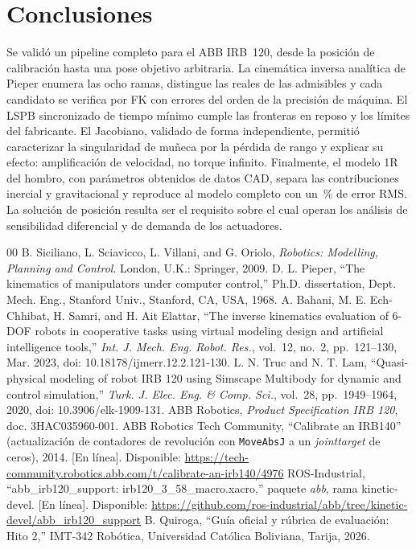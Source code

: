 \documentclass[conference]{IEEEtran}
\begin{document}
\section{Conclusiones}
Se validó un pipeline completo para el ABB IRB~120, desde la posición de calibración hasta una pose objetivo
arbitraria. La cinemática inversa analítica de Pieper enumera las ocho ramas, distingue las reales de las admisibles y
cada candidato se verifica por FK con errores del orden de la precisión de máquina. El LSPB sincronizado de tiempo
mínimo cumple las fronteras en reposo y los límites del fabricante. El Jacobiano, validado de forma independiente,
permitió caracterizar la singularidad de muñeca por la pérdida de rango y explicar su efecto: amplificación de
velocidad, no torque infinito. Finalmente, el modelo 1R del hombro, con parámetros obtenidos de datos CAD, separa las
contribuciones inercial y gravitacional y reproduce al modelo completo con un \RMSPct\,\% de error RMS. La solución de
posición resulta ser el requisito sobre el cual operan los análisis de sensibilidad diferencial y de demanda de los
actuadores.

\begin{thebibliography}{00}
 B. Siciliano, L. Sciavicco, L. Villani, and G. Oriolo, \textit{Robotics: Modelling, Planning and
Control}. London, U.K.: Springer, 2009.
 D. L. Pieper, ``The kinematics of manipulators under computer control,'' Ph.D. dissertation, Dept.
Mech. Eng., Stanford Univ., Stanford, CA, USA, 1968.
 A. Bahani, M. E. Ech-Chhibat, H. Samri, and H. Ait Elattar, ``The inverse kinematics evaluation of
6-DOF robots in cooperative tasks using virtual modeling design and artificial intelligence tools,''
\textit{Int. J. Mech. Eng. Robot. Res.}, vol.~12, no.~2, pp.~121--130, Mar. 2023, doi: 10.18178/ijmerr.12.2.121-130.
 L. N. Truc and N. T. Lam, ``Quasi-physical modeling of robot IRB 120 using Simscape Multibody for
dynamic and control simulation,'' \textit{Turk. J. Elec. Eng. \& Comp. Sci.}, vol.~28, pp.~1949--1964, 2020,
doi: 10.3906/elk-1909-131.
 ABB Robotics, \textit{Product Specification IRB 120}, doc. 3HAC035960-001.
 ABB Robotics Tech Community, ``Calibrate an IRB140'' (actualización de contadores de revolución con
\texttt{MoveAbsJ} a un \textit{jointtarget} de ceros), 2014. [En línea]. Disponible:
\url{https://tech-community.robotics.abb.com/t/calibrate-an-irb140/4976}
 ROS-Industrial, ``abb\_irb120\_support: irb120\_3\_58\_macro.xacro,'' paquete \textit{abb}, rama
kinetic-devel. [En línea]. Disponible: \url{https://github.com/ros-industrial/abb/tree/kinetic-devel/abb_irb120_support}
 B. Quiroga, ``Guía oficial y rúbrica de evaluación: Hito 2,'' IMT-342 Robótica, Universidad Católica
Boliviana, Tarija, 2026.
\end{thebibliography}
\end{document}
